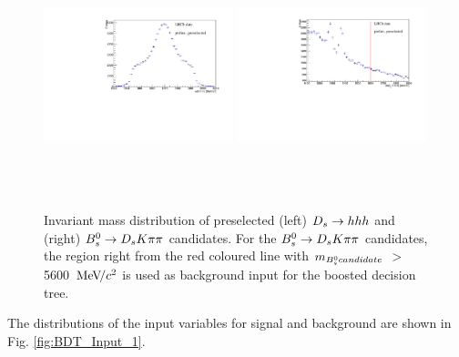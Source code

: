 \begin{figure}[h]
\includegraphics[height=7.0cm,width=0.49\textwidth]{figs/Ds_MM_afterpresel.pdf}
\includegraphics[height=7.0cm,width=0.49\textwidth]{figs/Bs_MM_afterpresel.pdf}
\caption{Invariant mass distribution of preselected (left) ${{D}_{s}}\rightarrow{\ensuremath{h}}{\ensuremath{h}}{\ensuremath{h}}$ and (right) ${{B}^0_{s}}\rightarrow{\ensuremath{{D}_{s}}}{\ensuremath{K}}{\ensuremath{\pi}}{\ensuremath{\pi}}$ candidates. 
For the  ${{B}^0_{s}}\rightarrow{\ensuremath{{D}_{s}}}{\ensuremath{K}}{\ensuremath{\pi}}{\ensuremath{\pi}}$ candidates, the region right from the red coloured line with $m_{{{B}^0_{s}} candidate}$ $>$ 5600 ${\mathrm{\,Me\kern -0.1em V\!/}c^2}$ is used as background input for the boosted decision tree.}
\label{fig:massforBDT}
\end{figure}

The distributions of the input variables for signal and background are shown in Fig. \ref{fig:BDT_Input_1}. 

